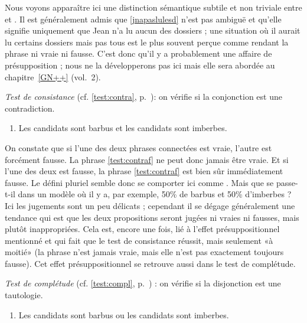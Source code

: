 \begin{exo}
\begin{solu}
Nous voyons apparaître ici une distinction sémantique subtile et non triviale entre  et .
Il est généralement admis que \ref{jnapaslulesd} n'est pas ambiguë et qu'elle signifie uniquement que Jean n'a lu aucun des dossiers ; une situation où il aurait lu certains dossiers mais pas tous est le plus souvent perçue comme rendant la phrase ni vraie ni fausse. C'est donc qu'il y a probablement une affaire de présupposition ; nous ne la développerons pas ici mais elle sera abordée au chapitre~\ref{GN++} (vol.~2).

\smallskip

\noindent\emph{Test de consistance} (cf. \ref{test:contra}, p.~\pageref{test:contra}): on vérifie si la conjonction  est une contradiction.

\begin{enumerate}[label=(\arabic*),resume]
\item Les candidats sont barbus et les candidats sont imberbes.\label{test:contraf}
\end{enumerate}


On constate que si l'une des deux phrases connectées est vraie, l'autre est forcément fausse.  La phrase \ref{test:contraf} ne peut donc jamais être vraie. 
Et si l'une des deux est fausse, la phrase \ref{test:contraf} est bien sûr immédiatement fausse.  Le défini pluriel semble donc se comporter ici comme .   Mais que se passe-t-il dans 
 un modèle où il y a, par exemple, 50\% de barbus et 50\% d'imberbes ?
Ici les jugements sont un peu délicats ; cependant il se dégage généralement  une tendance  qui est que les deux propositions seront jugées ni vraies ni fausses, mais plutôt inappropriées. Cela est, encore une fois,  lié à l'effet présuppositionnel mentionné  et qui fait que le test de consistance réussit, mais seulement «à moitié» (la phrase n'est jamais vraie, mais elle n'est pas exactement toujours fausse).   Cet effet présuppositionnel se retrouve aussi dans le test de complétude.

\smallskip

\noindent\emph{Test de complétude} (cf. \ref{test:compl}, p.~\pageref{test:compl}) : on vérifie si la disjonction  est une tautologie.

\begin{enumerate}[label=(\arabic*),resume]
\item Les candidats sont barbus ou les candidats sont imberbes.\label{test:complf}
\end{enumerate}


\end{solu}
\end{exo}
